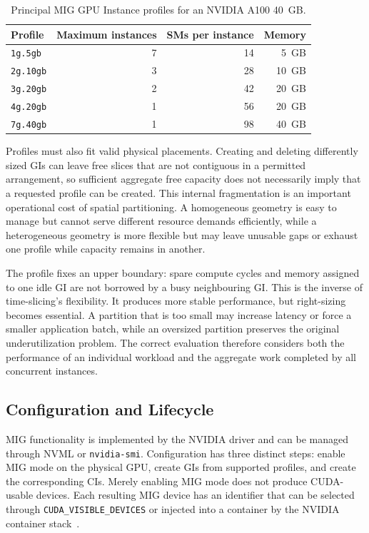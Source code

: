 \begin{table}[htbp]
    \centering
    \caption{Principal MIG GPU Instance profiles for an NVIDIA A100 40~GB.}
    \label{tab:a100-mig-profiles}
    \begin{tabular}{@{}lrrr@{}}
        \toprule
        \textbf{Profile} & \textbf{Maximum instances} & \textbf{SMs per instance} & \textbf{Memory} \\
        \midrule
        \texttt{1g.5gb}  & 7 & 14 & 5~GB \\
        \texttt{2g.10gb} & 3 & 28 & 10~GB \\
        \texttt{3g.20gb} & 2 & 42 & 20~GB \\
        \texttt{4g.20gb} & 1 & 56 & 20~GB \\
        \texttt{7g.40gb} & 1 & 98 & 40~GB \\
        \bottomrule
    \end{tabular}
\end{table}

Profiles must also fit valid physical placements. Creating and deleting differently sized GIs can leave free slices that are not contiguous in a permitted arrangement, so sufficient aggregate free capacity does not necessarily imply that a requested profile can be created. This internal fragmentation is an important operational cost of spatial partitioning. A homogeneous geometry is easy to manage but cannot serve different resource demands efficiently, while a heterogeneous geometry is more flexible but may leave unusable gaps or exhaust one profile while capacity remains in another.

The profile fixes an upper boundary: spare compute cycles and memory assigned to one idle GI are not borrowed by a busy neighbouring GI. This is the inverse of time-slicing's flexibility. It produces more stable performance, but right-sizing becomes essential. A partition that is too small may increase latency or force a smaller application batch, while an oversized partition preserves the original underutilization problem. The correct evaluation therefore considers both the performance of an individual workload and the aggregate work completed by all concurrent instances.

\subsection{Configuration and Lifecycle}

MIG functionality is implemented by the NVIDIA driver and can be managed through NVML or \texttt{nvidia-smi}. Configuration has three distinct steps: enable MIG mode on the physical GPU, create GIs from supported profiles, and create the corresponding CIs. Merely enabling MIG mode does not produce CUDA-usable devices. Each resulting MIG device has an identifier that can be selected through \texttt{CUDA\_VISIBLE\_DEVICES} or injected into a container by the NVIDIA container stack~\cite{nvidia2026miggettingstarted}.

